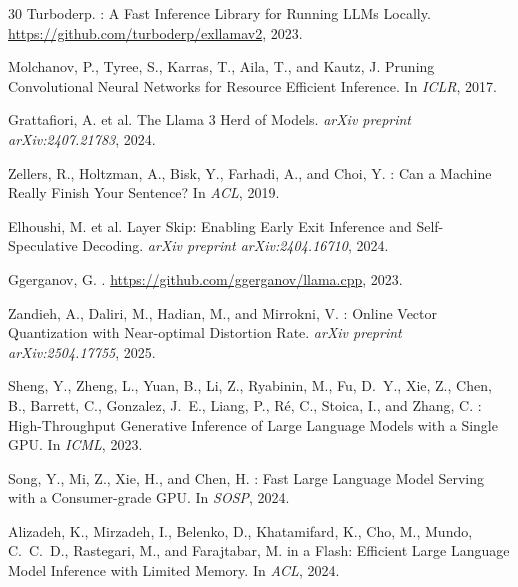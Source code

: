 \documentclass{article}
\begin{document}
\begin{thebibliography}{30}
Turboderp.
: A Fast Inference Library for Running {LLMs} Locally.
\newblock \url{https://github.com/turboderp/exllamav2}, 2023.

Molchanov, P., Tyree, S., Karras, T., Aila, T., and Kautz, J.
\newblock Pruning Convolutional Neural Networks for Resource Efficient Inference.
\newblock In \emph{ICLR}, 2017.

Grattafiori, A. et al.
\newblock The {Llama} 3 Herd of Models.
\newblock \emph{arXiv preprint arXiv:2407.21783}, 2024.

Zellers, R., Holtzman, A., Bisk, Y., Farhadi, A., and Choi, Y.
: Can a Machine Really Finish Your Sentence?
\newblock In \emph{ACL}, 2019.

Elhoushi, M. et al.
\newblock Layer Skip: Enabling Early Exit Inference and Self-Speculative Decoding.
\newblock \emph{arXiv preprint arXiv:2404.16710}, 2024.

Ggerganov, G.
.
\newblock \url{https://github.com/ggerganov/llama.cpp}, 2023.

Zandieh, A., Daliri, M., Hadian, M., and Mirrokni, V.
: Online Vector Quantization with Near-optimal Distortion Rate.
\newblock \emph{arXiv preprint arXiv:2504.17755}, 2025.

Sheng, Y., Zheng, L., Yuan, B., Li, Z., Ryabinin, M., Fu, D.~Y., Xie, Z., Chen, B., Barrett, C., Gonzalez, J.~E., Liang, P., R{\'e}, C., Stoica, I., and Zhang, C.
: High-Throughput Generative Inference of Large Language Models with a Single {GPU}.
\newblock In \emph{ICML}, 2023.

Song, Y., Mi, Z., Xie, H., and Chen, H.
: Fast Large Language Model Serving with a Consumer-grade {GPU}.
\newblock In \emph{SOSP}, 2024.

Alizadeh, K., Mirzadeh, I., Belenko, D., Khatamifard, K., Cho, M., Mundo, C.~C.~D., Rastegari, M., and Farajtabar, M.
 in a Flash: Efficient Large Language Model Inference with Limited Memory.
\newblock In \emph{ACL}, 2024.


\end{thebibliography}
\end{document}
